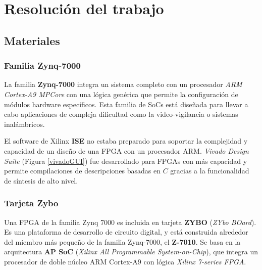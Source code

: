 
\chapter{Resolución del trabajo}
 
\section{Materiales}

\subsection{Familia Zynq-7000}

La familia \textbf{Zynq-7000} integra un sistema completo con un procesador \textit{ARM Cortex-A9 MPCore} con una lógica genérica que 
permite la configuración de módulos hardware específicos. Esta familia de SoCs está diseñada para llevar a cabo aplicaciones de compleja 
dificultad como la video-vigilancia o sistemas inalámbricos. 

El software de Xilinx \textbf{ISE} no estaba preparado para soportar la complejidad y capacidad de un diseño de una FPGA con un procesador 
ARM. \textit{Vivado Design Suite} (Figura \ref{vivadoGUI}) fue desarrollado para FPGAs con más capacidad y permite compilaciones de descripciones 
basadas en \(C\) gracias a la funcionalidad de síntesis de alto nivel.

\subsection{Tarjeta Zybo}

Una FPGA de la familia Zynq 7000 es incluida en tarjeta \textbf{ZYBO} (\textit{ZYbo BOard}). Es una plataforma de desarrollo de circuito 
digital, y está construida alrededor del miembro más pequeño de la familia Zynq-7000, el \textbf{Z-7010}. Se basa en la arquitectura 
\textbf{AP SoC} (\textit{Xilinx All Programmable System-on-Chip}), que integra un procesador 
de doble núcleo ARM Cortex-A9 con lógica \textit{Xilinx 7-series FPGA}.


